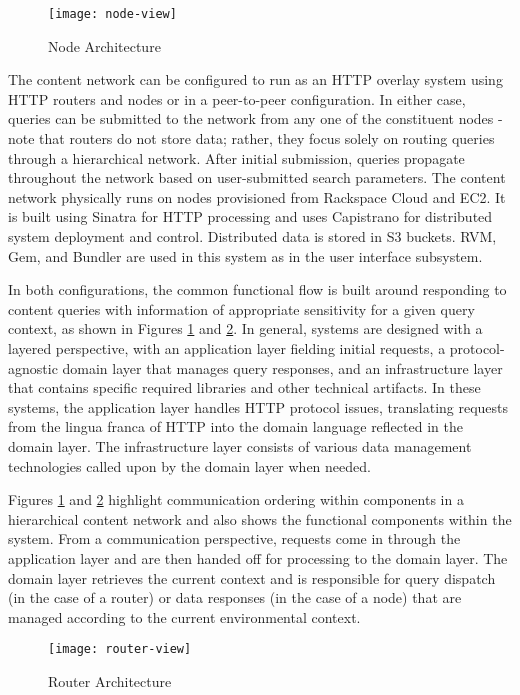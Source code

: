 \begin{figure}[!t]
\centering
\texttt{[image: node-view]}
\caption{Node Architecture}
\label{fig:model:node-view}
\end{figure}

The content network can be configured to run as an HTTP overlay system using HTTP routers and nodes or in a peer-to-peer configuration.  In either case, queries can be submitted to the network from any one of the constituent nodes - note that routers do not store data; rather, they focus solely on routing queries through a hierarchical network.  After initial submission, queries propagate throughout the network based on user-submitted search parameters.  The content network physically runs on nodes provisioned from Rackspace Cloud and EC2.  It is built using Sinatra for HTTP processing and uses Capistrano for distributed system deployment and control.  Distributed data is stored in S3 buckets.  RVM, Gem, and Bundler are used in this system as in the user interface subsystem.

In both configurations, the common functional flow is built around responding to content queries with information of appropriate sensitivity for a given query context, as shown in Figures \ref{fig:model:node-view} and \ref{fig:model:router-view}.  In general, systems are designed with a layered perspective, with an application layer fielding initial requests, a protocol-agnostic domain layer that manages query responses, and an infrastructure layer that contains specific required libraries and other technical artifacts.  In these systems, the application layer handles HTTP protocol issues, translating requests from the lingua franca of HTTP into the domain language reflected in the domain layer.  The infrastructure layer consists of various data management technologies called upon by the domain layer when needed.

Figures \ref{fig:model:node-view} and \ref{fig:model:router-view} highlight communication ordering within components in a hierarchical content network and also shows the functional components within the system.  From a communication perspective, requests come in through the application layer and are then handed off for processing to the domain layer.  The domain layer retrieves the current context and is responsible for query dispatch (in the case of a router) or data responses (in the case of a node) that are managed according to the current environmental context.

\begin{figure}[!t]
\centering
\texttt{[image: router-view]}
\caption{Router Architecture}
\label{fig:model:router-view}
\end{figure}

